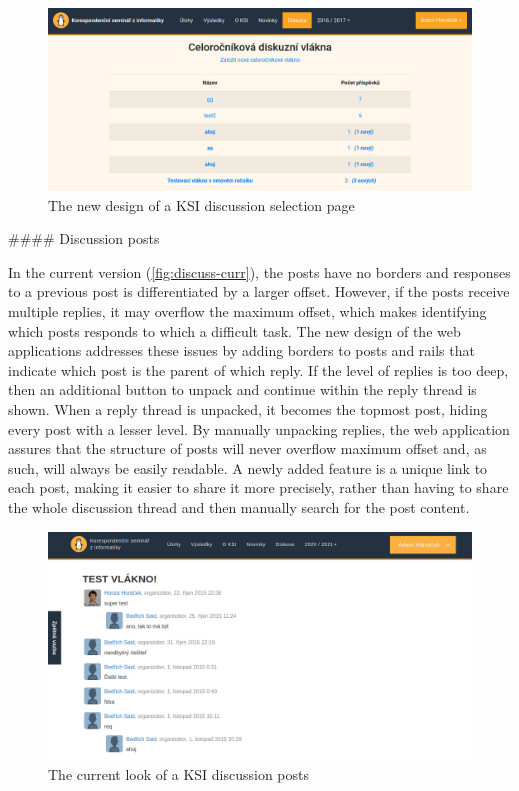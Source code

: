 \documentclass[
  digital, %
  oneside, %
  lof,     %
  nolot,     %
]{fithesis4}
\begin{document}
{\begin{figure}
\includegraphics[width=\textwidth]{assets/img/discussionroot-new}
\caption{The new design of a KSI discussion selection page}
\label{fig:discussroot-new}
\end{figure}

#### Discussion posts

In the current version (\autoref{fig:discuss-curr}), the posts have no borders and responses to a previous post is differentiated by a larger offset. However, if the posts receive multiple replies, it may overflow the maximum offset, which makes identifying which posts responds to which a difficult task. The new design of the web applications addresses these issues by adding borders to posts and rails that indicate which post is the parent of which reply. If the level of replies is too deep, then an additional button to unpack and continue within the reply thread is shown. When a reply thread is unpacked, it becomes the topmost post, hiding every post with a lesser level. By manually unpacking replies, the web application assures that the structure of posts will never overflow maximum offset and, as such, will always be easily readable. A newly added feature is a unique link to each post, making it easier to share it more precisely, rather than having to share the whole discussion thread and then manually search for the post content.

\begin{figure}
\includegraphics[width=\textwidth]{assets/img/discussion-curr}
\caption{The current look of a KSI discussion posts}
\label{fig:discuss-curr}
\end{figure}

}
\end{document}
